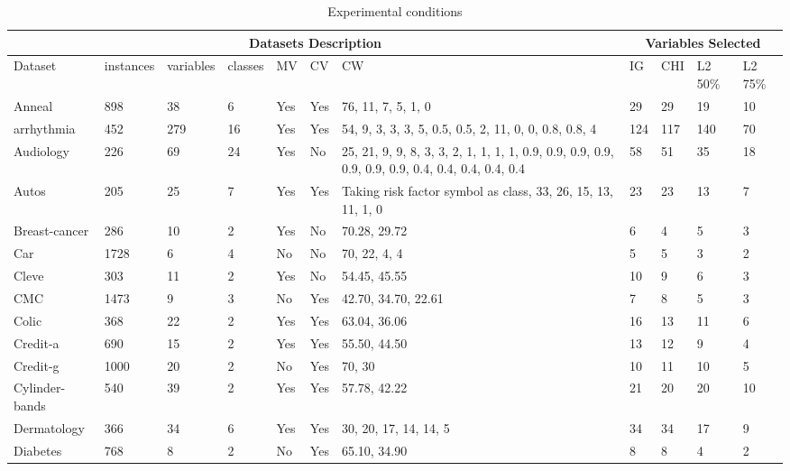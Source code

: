 \documentclass[review]{elsarticle}
\begin{document}
	

\begin{table}[htbp]
	\centering
	\caption{Experimental conditions}
	\label{tab:expcond}
	
\begin{tabular}{|p{1.5cm}|p{0.5cm}|p{0.5cm}|p{0.5cm}|p{0.5cm}|p{0.5cm}|p{2cm}|p{0.5cm}|p{0.5cm}|p{1cm}|p{1cm}|}
	\hline 
	\multicolumn{7}{|c|}{Datasets Description} &
	\multicolumn{4}{|c|}{ Variables Selected } \\ 

\hline Dataset & instances & variables & classes & MV & CV & CW & IG & CHI & L2 50\%  & L2 75\% \\ 
	\hline Anneal & 898 & 38 & 6 & Yes & Yes & 76,  11, 7, 5, 1, 0 & 29 & 29 & 19 & 10 \\ 
	\hline arrhythmia & 452 & 279 & 16 & Yes & Yes & 54, 9, 3, 3, 3, 5, 0.5, 0.5, 2, 11, 0, 0, 0.8, 0.8, 4 & 124 & 117 & 140 & 70 \\ 
\hline Audiology & 226 & 69 & 24 & Yes & No & 25,  21, 9, 9, 8, 3, 3, 2, 1, 1, 1, 1,  0.9, 0.9, 0.9, 0.9, 0.9, 0.9, 0.9, 0.4, 0.4, 0.4, 0.4,  0.4 & 58 & 51 & 35 & 18 \\ 
\hline Autos & 205 & 25 & 7 & Yes & Yes & Taking risk factor symbol as class,  33, 26, 15, 13, 11, 1, 0 & 23 & 23 & 13 & 7 \\ 
\hline Breast-cancer & 286 & 10 & 2 & Yes & No & 70.28, 29.72 & 6 & 4 & 5 & 3 \\ 
\hline Car & 1728 & 6 & 4 & No & No & 70,  22, 4, 4 & 5 & 5 & 3 & 2 \\ 
\hline Cleve & 303 & 11 & 2 & Yes & No & 54.45, 45.55 & 10 & 9 & 6 & 3 \\ 
\hline CMC & 1473 & 9 & 3 & No & Yes & 42.70, 34.70, 22.61  & 7 & 8 & 5 & 3 \\ 
\hline Colic & 368 & 22 & 2 & Yes & Yes & 63.04, 36.06 & 16 & 13 & 11 & 6 \\ 
\hline Credit-a & 690 & 15 & 2 & Yes & Yes & 55.50, 44.50 & 13 & 12 & 9 & 4 \\ 
\hline Credit-g & 1000 & 20 & 2 & No & Yes & 70, 30 & 10 & 11 & 10 & 5 \\
\hline Cylinder-bands & 540 & 39 & 2 & Yes & Yes & 57.78, 42.22 & 21 & 20 & 20 & 10 \\ 
\hline Dermatology & 366 & 34 & 6 & Yes & Yes & 30, 20, 17, 14, 14, 5 &  34 & 34 & 17 & 9 \\
\hline Diabetes & 768 & 8 & 2 & No & Yes & 65.10, 34.90 & 8 & 8 & 4 & 2 \\

\end{tabular}
\end{table}
\end{document}
